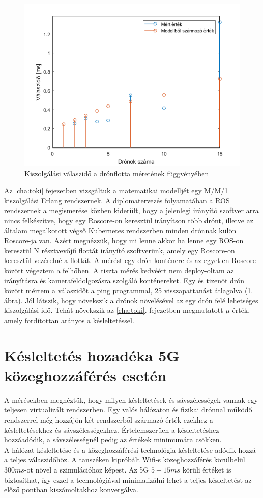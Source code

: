 \begin{figure}
	\centering
	\includegraphics{figures/meres_iperf_model.png}
	\caption{Kiszolgálási válaszidő a drónflotta méretének függvényében}
	\label{fig:meresros}
\end{figure}

\noindent
Az \ref{cha:toki} fejezetben vizsgáltuk a matematikai modelljét egy M/M/1 kiszolgálási Erlang rendszernek. A diplomatervezés folyamatában a ROS rendszernek a megismerése közben kiderült, hogy a jelenlegi irányító szoftver arra nincs felkészítve, hogy egy Roscore-on keresztül irányítson több drónt, illetve az általam megalkotott végső Kubernetes rendszerben minden drónnak külön Roscore-ja van. Azért megnézzük, hogy mi lenne akkor ha lenne egy ROS-on keresztül N résztvevőjű flottát irányító szoftverünk, amely egy Roscore-on keresztül vezérelné a flottát. A mérést egy drón konténere és az egyetlen Roscore között végeztem a felhőben. A tiszta mérés kedvéért nem deploy-oltam az irányításra és kamerafeldolgozásra szolgáló konténereket. Egy és tizenöt drón között mértem a válaszidőt a ping programmal, 25 visszapattanást átlagolva (\ref{fig:meresros}. ábra). Jól látszik, hogy növekszik a drónok növelésével az egy drón felé lehetséges kiszolgálási idő. Tehát növekszik az \ref{cha:toki}. fejezetben megmutatott $\mu$ érték, amely fordítottan arányos a késleltetéssel.

\section{Késleltetés hozadéka 5G közeghozzáférés esetén}
A mérésekben megnéztük, hogy milyen késleltetések és sávszélességek vannak egy teljesen virtualizált rendszerben. Egy valós hálózaton és fizikai drónnal működő rendszerrel még hozzájön két rendszerből származó érték ezekhez a késleltetésekhez és sávszélességekhez. Értelemszerűen a késleltetéshez hozzáadódik, a sávszélességnél pedig az értékek minimumára csökken. \\

\noindent
A hálózat késleltetése és a közeghozzáférési technológia késleltetése adódik hozzá a teljes válaszidőhöz. A tanszéken kipróbált Wifi-s közeghozzáférés körülbelül $300 ms$-ot növel a szimulációhoz képest. Az 5G $5-15 ms$ körüli értéket is biztosíthat, így ezzel a technológiával minimalizálni lehet a teljes késleltetést az előző pontban kiszámoltakhoz konvergálva.
